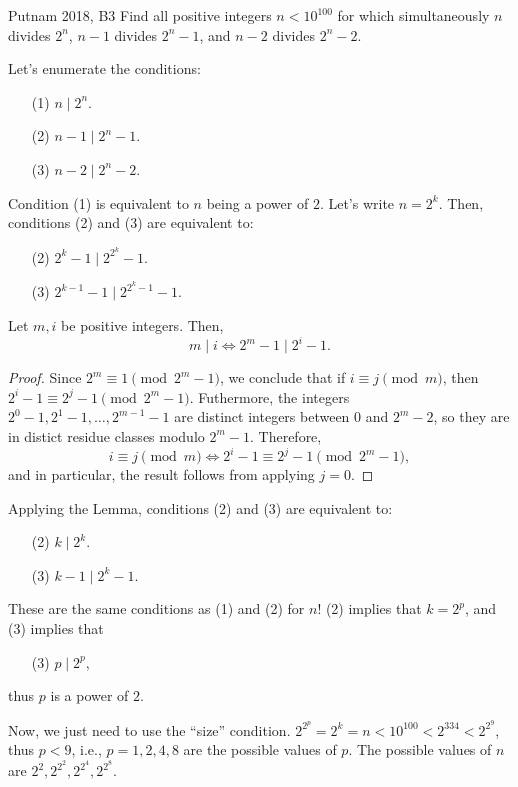 
\begin{prob}{Putnam 2018, B3}{}
Find all positive integers $n < 10^{100}$ for which simultaneously $n$ divides $2^n$, $n-1$ divides $2^n - 1$, and $n-2$ divides $2^n - 2$.
\end{prob}

\begin{sol}{}{}
	Let's enumerate the conditions:
	\begin{enumerate}
		\item[(1)] \(n \mid 2^n\).
		\item[(2)] \(n - 1 \mid 2^n - 1\).
		\item[(3)] \(n - 2 \mid 2^n - 2\).
	\end{enumerate}

	Condition (1) is equivalent to \(n\) being a power of \(2\). Let's write \(n = 2^k\). Then, conditions (2) and (3) are equivalent to:
	\begin{enumerate}
		\item[(2)] \(2^k - 1 \mid 2^{2^k} - 1\).
		\item[(3)] \(2^{k-1} - 1 \mid 2^{2^k - 1} - 1\).
	\end{enumerate}

	\begin{lem}{}{}
		Let \(m, i\) be positive integers. Then,
		\[m \mid i \iff 2^m - 1 \mid 2^i - 1.\]
	\end{lem}
	\begin{proof}
	Since \(2^m \equiv 1 \pmod{2^m - 1}\), we conclude that if \(i \equiv j \pmod{m}\), then \(2^i - 1 \equiv 2^j - 1 \pmod{2^m - 1}\).
	Futhermore, the integers \(2^0 - 1, 2^1 - 1, \dots, 2^{m-1} - 1\) are distinct integers between \(0\) and \(2^m - 2\), so they are in distict residue classes modulo  \(2^m - 1\). Therefore, \[
		i \equiv j \pmod{m} \iff 2^i - 1 \equiv 2^j - 1 \pmod{2^m - 1},
	\]
	and in particular, the result follows from applying \(j = 0\).
	\end{proof}

	Applying the Lemma, conditions (2) and (3) are equivalent to:
	\begin{enumerate}
		\item[(2)] \(k \mid 2^k\).
		\item[(3)] \(k - 1 \mid 2^k - 1\).
	\end{enumerate}

	These are the same conditions as (1) and (2) for \(n\)! (2) implies that \(k = 2^p\), and (3) implies that
	\begin{enumerate}
		\item[(3)] \(p \mid 2^p\),
	\end{enumerate}
	thus \(p\) is a power of \(2\).

	Now, we just need to use the ``size'' condition.  \(2^{2^p} = 2^k = n < 10^{100} < 2^{334} < 2^{2^{9}}\), thus \(p < 9\), i.e.,  \(p = 1, 2, 4, 8\) are the possible values of \(p\). The  possible values of \(n\) are \(2^2, 2^{2^2}, 2^{2^4}, 2^{2^8}\).
\end{sol}


